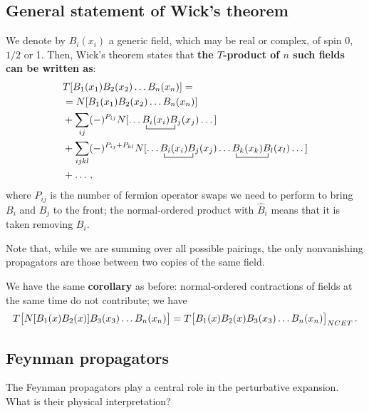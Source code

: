 \documentclass[main.tex]{subfiles}
\begin{document}
\subsection{General statement of Wick's theorem}

We denote by \(B_i (x_i)\) a generic field, which may be real or complex, of spin 0, \(1/2\) or 1. Then, Wick's theorem states that \textbf{the \(T\)-product of \(n\) such fields can be written as}: 
%
\begin{subequations}
\begin{align}
\begin{split}
& T[B_1 (x_1 ) B_2 (x_2 ) \dots B_n (x_n)]= \\
&= N[B_1 (x_1 ) B_2 (x_2 ) \dots B_n (x_n)]  \\
&+ \sum _{ij} (-)^{P_{ij}} 
 N[ \dots \bcontraction{}{B}{_i (x_i)}{B}
 B_i(x_i)B_j(x_j) \dots]  \\
&+ \sum _{ijkl} (-)^{P_{ij}+P_{kl}} N[\dots  \bcontraction{}{B}{_i (x_i)}{B}
B_i(x_i)B_j(x_j) \dots \bcontraction{}{B}{_k (x_k)}{B}
B_k(x_k)B_l(x_l) \dots]  \\
&+ \dots \,,
\end{split}
\end{align}
\end{subequations}
%
where \(P_{ij}\) is the number of fermion operator swaps we need to perform to bring \(B_i\) and \(B_j\) to the front; the normal-ordered product with \(\hat{B}_i\) means that it is taken removing \(B_i\). 


Note that, while we are summing over all possible pairings, the only nonvanishing propagators are those between two copies of the same field. 

We have the same \textbf{corollary} as before: normal-ordered contractions of fields at the same time do not contribute; we have 
%
\begin{align}
T \qty[N[B_1 (x) B_2 (x)] B_3 (x_3 ) \dots B_n (x_n)] 
= T \qty[B_1 (x) B_2 (x) B_3 (x_3) \dots B_n (x_n)]_{NCET}
\,.
\end{align}

\subsection{Feynman propagators}

The Feynman propagators play a central role in the perturbative expansion. What is their physical interpretation?
\end{document}
